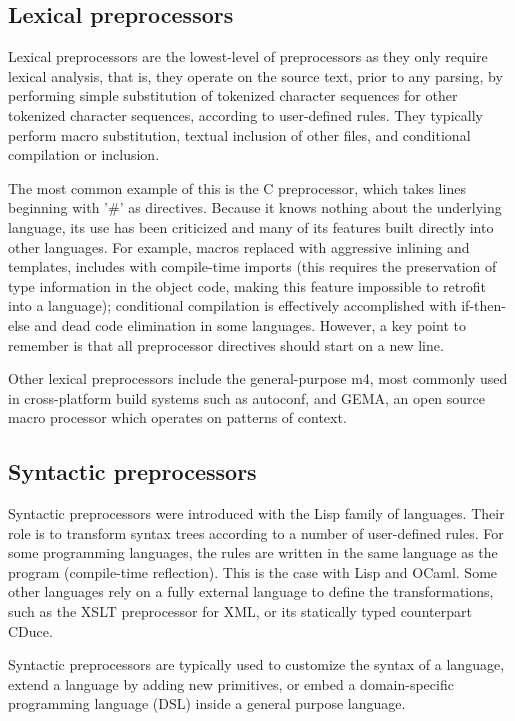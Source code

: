 \documentclass[a4paper]{report}
\begin{document}
\subsection{Lexical preprocessors}
Lexical preprocessors are the lowest-level of preprocessors as they only require lexical analysis, that is, they operate on the source text, prior to any parsing, by performing simple substitution of tokenized character sequences for other tokenized character sequences, according to user-defined rules. They typically perform macro substitution, textual inclusion of other files, and conditional compilation or inclusion. 
\par
The most common example of this is the C preprocessor, which takes lines beginning with '\#' as directives. Because it knows nothing about the underlying language, its use has been criticized and many of its features built directly into other languages. For example, macros replaced with aggressive inlining and templates, includes with compile-time imports (this requires the preservation of type information in the object code, making this feature impossible to retrofit into a language); conditional compilation is effectively accomplished with if-then-else and dead code elimination in some languages. However, a key point to remember is that all preprocessor directives should start on a new line. 
\par
Other lexical preprocessors include the general-purpose m4, most commonly used in cross-platform build systems such as autoconf, and GEMA, an open source macro processor which operates on patterns of context. 

\subsection{Syntactic preprocessors}
Syntactic preprocessors were introduced with the Lisp family of languages. Their role is to transform syntax trees according to a number of user-defined rules. For some programming languages, the rules are written in the same language as the program (compile-time reflection). This is the case with Lisp and OCaml. Some other languages rely on a fully external language to define the transformations, such as the XSLT preprocessor for XML, or its statically typed counterpart CDuce.
\par
Syntactic preprocessors are typically used to customize the syntax of a language, extend a language by adding new primitives, or embed a domain-specific programming language (DSL) inside a general purpose language. 
\end{document}
